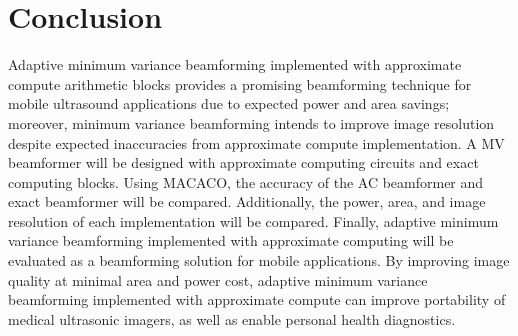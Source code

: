 \documentclass[journal]{IEEEtran}
\begin{document}
%






\section{Conclusion}

Adaptive minimum variance beamforming implemented with approximate compute arithmetic blocks provides a promising beamforming technique for mobile ultrasound applications due to expected power and area savings; moreover, minimum variance beamforming intends to improve image resolution despite expected inaccuracies from approximate compute implementation. A MV beamformer will be designed with approximate computing circuits and exact computing blocks. Using MACACO, the accuracy of the AC beamformer and exact beamformer will be compared. Additionally, the power, area, and image resolution of each implementation will be compared. Finally, adaptive minimum variance beamforming implemented with approximate computing will be evaluated as a beamforming solution for mobile applications. By improving image quality at minimal area and power cost, adaptive minimum variance beamforming implemented with approximate compute can improve portability of medical ultrasonic imagers, as well as enable personal health diagnostics. 
\end{document}
